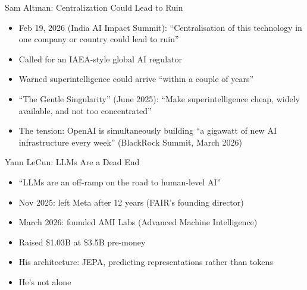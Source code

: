 \documentclass[aspectratio=169]{beamer}
\begin{document}


\begin{frame}{Sam Altman: Centralization Could Lead to Ruin}
    \begin{itemize}
        \item Feb 19, 2026 (India AI Impact Summit): ``Centralisation of this technology in one company or country could lead to ruin''
        \vspace{0.3em}
        \item Called for an IAEA-style global AI regulator
        \vspace{0.3em}
        \item Warned superintelligence could arrive ``within a couple of years''
        \vspace{0.3em}
        \item ``The Gentle Singularity'' (June 2025): ``Make superintelligence cheap, widely available, and not too concentrated''
        \vspace{0.3em}
        \item The tension: OpenAI is simultaneously building ``a gigawatt of new AI infrastructure every week'' (BlackRock Summit, March 2026)
    \end{itemize}
\end{frame}


\begin{frame}{Yann LeCun: LLMs Are a Dead End}
    \begin{itemize}
        \item ``LLMs are an off-ramp on the road to human-level AI''
        \vspace{0.3em}
        \item Nov 2025: left Meta after 12 years (FAIR's founding director)
        \vspace{0.3em}
        \item March 2026: founded AMI Labs (Advanced Machine Intelligence)
        \vspace{0.3em}
        \item Raised \$1.03B at \$3.5B pre-money
        \vspace{0.3em}
        \item His architecture: JEPA, predicting representations rather than tokens
        \vspace{0.3em}
        \item He's not alone
    \end{itemize}
\end{frame}
\end{document}
